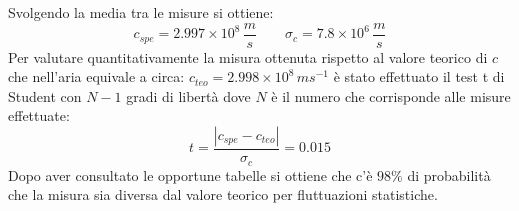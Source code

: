 Svolgendo la media tra le misure si ottiene:
\begin{equation}
    \nonumber
    c_{spe}=2.997\times10^8 \, \frac{m}{s} \qquad \sigma_c=7.8\times10^6 \, \frac{m}{s} 
\end{equation}
Per valutare quantitativamente la misura ottenuta rispetto al valore teorico di $c$ che nell'aria equivale a circa: $c_{teo}=2.998\times10^{8} \,ms^{-1}$ è stato effettuato il test t di Student con $N-1$ gradi di libertà dove $N$ è il numero che corrisponde alle misure effettuate:
\begin{equation}
    t=\frac{|c_{spe}-c_{teo}|}{\sigma_c}=0.015
\end{equation}
Dopo aver consultato le opportune tabelle si ottiene che c'è $98\%$ di probabilità che la misura sia diversa dal valore teorico per fluttuazioni statistiche.
\newpage
